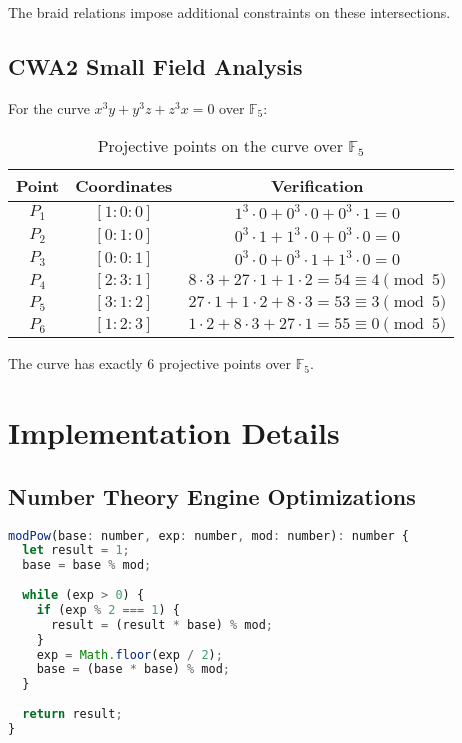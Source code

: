 \documentclass[11pt]{article}
\begin{document}
The braid relations impose additional constraints on these intersections.

\subsection{CWA2 Small Field Analysis}

For the curve $x^3y + y^3z + z^3x = 0$ over $\mathbb{F}_5$:

\begin{table}[H]
\centering
\begin{tabular}{@{}ccc@{}}
\toprule
Point & Coordinates & Verification \\
\midrule
$P_1$ & $[1:0:0]$ & $1^3 \cdot 0 + 0^3 \cdot 0 + 0^3 \cdot 1 = 0$ \\
$P_2$ & $[0:1:0]$ & $0^3 \cdot 1 + 1^3 \cdot 0 + 0^3 \cdot 0 = 0$ \\
$P_3$ & $[0:0:1]$ & $0^3 \cdot 0 + 0^3 \cdot 1 + 1^3 \cdot 0 = 0$ \\
$P_4$ & $[2:3:1]$ & $8 \cdot 3 + 27 \cdot 1 + 1 \cdot 2 = 54 \equiv 4 \pmod{5}$ \\
$P_5$ & $[3:1:2]$ & $27 \cdot 1 + 1 \cdot 2 + 8 \cdot 3 = 53 \equiv 3 \pmod{5}$ \\
$P_6$ & $[1:2:3]$ & $1 \cdot 2 + 8 \cdot 3 + 27 \cdot 1 = 55 \equiv 0 \pmod{5}$ \\
\bottomrule
\end{tabular}
\caption{Projective points on the curve over $\mathbb{F}_5$}
\end{table}

The curve has exactly 6 projective points over $\mathbb{F}_5$.

\section{Implementation Details}

\subsection{Number Theory Engine Optimizations}

\begin{lstlisting}[language=JavaScript, caption=Fast Modular Exponentiation]
modPow(base: number, exp: number, mod: number): number {
  let result = 1;
  base = base % mod;
  
  while (exp > 0) {
    if (exp % 2 === 1) {
      result = (result * base) % mod;
    }
    exp = Math.floor(exp / 2);
    base = (base * base) % mod;
  }
  
  return result;
}
\end{lstlisting}
\end{document}
